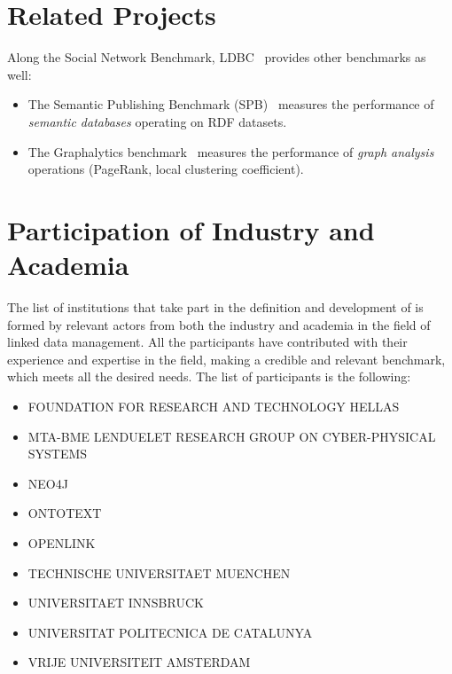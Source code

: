 
\section{Related Projects}

Along the Social Network Benchmark, LDBC~\cite{DBLP:journals/sigmod/AnglesBLF0ENMKT14} provides other benchmarks as well:

\begin{itemize}
	\item The Semantic Publishing Benchmark (SPB)~\cite{DBLP:conf/semweb/SpasicJP16} measures the performance of \emph{semantic databases} operating on RDF datasets.
	\item The Graphalytics benchmark~\cite{DBLP:journals/pvldb/IosupHNHPMCCSAT16} measures the performance of \emph{graph analysis} operations (\eg PageRank, local clustering coefficient).
\end{itemize}


\section{Participation of Industry and Academia}

The list of institutions that take part in the definition and development
of \ldbcsnb is formed by relevant actors from both the industry and academia in
the field of linked data management. All the participants have contributed with
their experience and expertise in the field, making a credible and relevant
benchmark, which meets all the desired needs. The list of participants is the
following:

\begin{itemize}
    \item FOUNDATION FOR RESEARCH AND TECHNOLOGY HELLAS
    \item MTA-BME LENDUELET RESEARCH GROUP ON CYBER-PHYSICAL SYSTEMS
    \item NEO4J
    \item ONTOTEXT
    \item OPENLINK
    \item TECHNISCHE UNIVERSITAET MUENCHEN
    \item UNIVERSITAET INNSBRUCK
    \item UNIVERSITAT POLITECNICA DE CATALUNYA
    \item VRIJE UNIVERSITEIT AMSTERDAM
\end{itemize}

